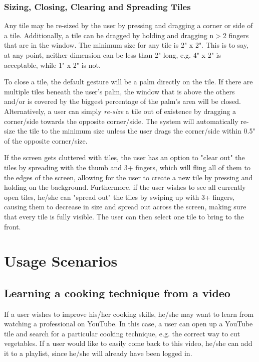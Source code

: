\documentclass[fleqn,10pt]{wlpeerj}
\begin{document}
\subsubsection*{Sizing, Closing, Clearing and Spreading Tiles}
Any tile may be re-sized by the user by pressing and dragging a corner or side of a tile. Additionally, a tile can be dragged by holding and dragging n$>$2 fingers that are in the window. The minimum size for any tile is 2" x 2". This is to say, at any point, neither dimension can be less than 2" long, e.g. 4" x 2" is acceptable, while 1" x 2" is not.

To close a tile, the default gesture will be a palm directly on the tile. If there are multiple tiles beneath the user's palm, the window that is above the others and/or is covered by the biggest percentage of the palm's area will be closed. Alternatively, a user can simply \emph{re-size} a tile out of existence by dragging a corner/side towards the opposite corner/side. The system will automatically re-size the tile to the minimum size unless the user drags the corner/side within 0.5" of the opposite corner/size.

If the screen gets cluttered with tiles, the user has an option to "clear out" the tiles by spreading with the thumb and 3+ fingers, which will fling all of them to the edges of the screen, allowing for the user to create a new tile by pressing and holding on the background. Furthermore, if the user wishes to see all currently open tiles, he/she can "spread out" the tiles by swiping up with 3+ fingers, causing them to decrease in size and spread out across the screen, making sure that every tile is fully visible. The user can then select one tile to bring to the front.

\section*{Usage Scenarios}
\subsection*{Learning a cooking technique from a video}
If a user wishes to improve his/her cooking skills, he/she may want to learn from watching a professional on YouTube. In this case, a user can open up a YouTube tile and search for a particular cooking technique, e.g. the correct way to cut vegetables. If a user would like to easily come back to this video, he/she can add it to a playlist, since he/she will already have been logged in.
\end{document}
